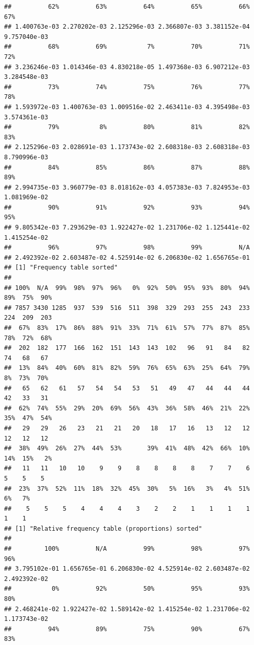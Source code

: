 \begin{verbatim}
##          62%          63%          64%          65%          66%          67% 
## 1.400763e-03 2.270202e-03 2.125296e-03 2.366807e-03 3.381152e-04 9.757040e-03 
##          68%          69%           7%          70%          71%          72% 
## 3.236246e-03 1.014346e-03 4.830218e-05 1.497368e-03 6.907212e-03 3.284548e-03 
##          73%          74%          75%          76%          77%          78% 
## 1.593972e-03 1.400763e-03 1.009516e-02 2.463411e-03 4.395498e-03 3.574361e-03 
##          79%           8%          80%          81%          82%          83% 
## 2.125296e-03 2.028691e-03 1.173743e-02 2.608318e-03 2.608318e-03 8.790996e-03 
##          84%          85%          86%          87%          88%          89% 
## 2.994735e-03 3.960779e-03 8.018162e-03 4.057383e-03 7.824953e-03 1.081969e-02 
##          90%          91%          92%          93%          94%          95% 
## 9.805342e-03 7.293629e-03 1.922427e-02 1.231706e-02 1.125441e-02 1.415254e-02 
##          96%          97%          98%          99%          N/A 
## 2.492392e-02 2.603487e-02 4.525914e-02 6.206830e-02 1.656765e-01 
## [1] "Frequency table sorted"
## 
## 100%  N/A  99%  98%  97%  96%   0%  92%  50%  95%  93%  80%  94%  89%  75%  90% 
## 7857 3430 1285  937  539  516  511  398  329  293  255  243  233  224  209  203 
##  67%  83%  17%  86%  88%  91%  33%  71%  61%  57%  77%  87%  85%  78%  72%  68% 
##  202  182  177  166  162  151  143  143  102   96   91   84   82   74   68   67 
##  13%  84%  40%  60%  81%  82%  59%  76%  65%  63%  25%  64%  79%   8%  73%  70% 
##   65   62   61   57   54   54   53   51   49   47   44   44   44   42   33   31 
##  62%  74%  55%  29%  20%  69%  56%  43%  36%  58%  46%  21%  22%  35%  47%  54% 
##   29   29   26   23   21   21   20   18   17   16   13   12   12   12   12   12 
##  38%  49%  26%  27%  44%  53%       39%  41%  48%  42%  66%  10%  14%  15%   2% 
##   11   11   10   10    9    9    8    8    8    8    7    7    6    5    5    5 
##  23%  37%  52%  11%  18%  32%  45%  30%   5%  16%   3%   4%  51%   6%   7% 
##    5    5    5    4    4    4    3    2    2    1    1    1    1    1    1 
## [1] "Relative frequency table (proportions) sorted"
## 
##         100%          N/A          99%          98%          97%          96% 
## 3.795102e-01 1.656765e-01 6.206830e-02 4.525914e-02 2.603487e-02 2.492392e-02 
##           0%          92%          50%          95%          93%          80% 
## 2.468241e-02 1.922427e-02 1.589142e-02 1.415254e-02 1.231706e-02 1.173743e-02 
##          94%          89%          75%          90%          67%          83% 

\end{verbatim}
